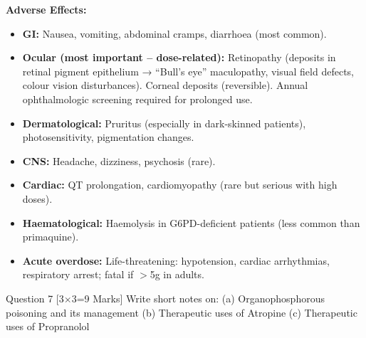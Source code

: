 \documentclass[11pt,a4paper]{article}
\begin{document}
\begin{ansbox}
\textbf{Adverse Effects:}
\begin{itemize}[leftmargin=*]
    \item \textbf{GI:} Nausea, vomiting, abdominal cramps, diarrhoea (most common).
    \item \textbf{Ocular (most important -- dose-related):} Retinopathy (deposits in retinal pigment epithelium → ``Bull's eye'' maculopathy, visual field defects, colour vision disturbances). Corneal deposits (reversible). Annual ophthalmologic screening required for prolonged use.
    \item \textbf{Dermatological:} Pruritus (especially in dark-skinned patients), photosensitivity, pigmentation changes.
    \item \textbf{CNS:} Headache, dizziness, psychosis (rare).
    \item \textbf{Cardiac:} QT prolongation, cardiomyopathy (rare but serious with high doses).
    \item \textbf{Haematological:} Haemolysis in G6PD-deficient patients (less common than primaquine).
    \item \textbf{Acute overdose:} Life-threatening: hypotension, cardiac arrhythmias, respiratory arrest; fatal if $>$5g in adults.
\end{itemize}
\end{ansbox}

\begin{qbox}{Question 7 [3$\times$3=9 Marks]}
Write short notes on: (a) Organophosphorous poisoning and its management \quad (b) Therapeutic uses of Atropine \quad (c) Therapeutic uses of Propranolol
\end{qbox}
\end{document}

